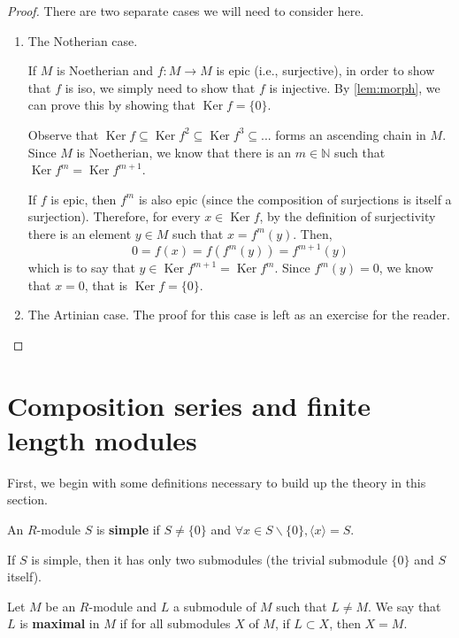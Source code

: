 \documentclass[12pt, a4paper, titlepage]{report}
\DeclareMathOperator{\Ker}{Ker}
\newcommand\dangle[1]{\langle {#1} \rangle}
\begin{document}
\begin{proof}
  There are two separate cases we will need to consider here.
  \begin{enumerate}[(1)]
  \item The Notherian case.

    If $M$ is Noetherian and $f : M \to M$ is epic (i.e., surjective), in order to show that $f$ is iso, we simply need to show that
    $f$ is injective. By \autoref{lem:morph}, we can prove this by showing that $\Ker f = \{0\}$.

    Observe that $\Ker f \subseteq \Ker f^2 \subseteq \Ker f^3 \subseteq ...$ forms an ascending chain in $M$. Since $M$ is
    Noetherian, we know that there is an $m \in \mathbb{N}$ such that $\Ker f^m = \Ker f^{m+1}$.

    If $f$ is epic, then $f^m$ is also epic (since the composition of surjections is itself a surjection). Therefore, for every
    $x \in \Ker f$, by the definition of surjectivity there is an element $y \in M$ such that $x = f^m(y)$.
    Then,
    \[
      0 = f(x) = f(f^m(y)) = f^{m+1}(y)
    \]
    which is to say that $y \in \Ker f^{m+1} = \Ker f^{m}$. Since $f^m(y) = 0$, we know that $x = 0$, that is $\Ker f = \{0\}$.

  \item The Artinian case. The proof for this case is left as an exercise for the reader.
  \end{enumerate}
\end{proof}

\section{Composition series and finite length modules}

First, we begin with some definitions necessary to build up the theory in this section.

\begin{defn}
  An $R$-module $S$ is \textbf{simple} if $S \neq \{0\}$ and $\forall x \in S\backslash\{0\}, \dangle{x} = S$.
\end{defn}

\begin{rem}
  If $S$ is simple, then it has only two submodules (the trivial submodule $\{0\}$ and $S$ itself).
\end{rem}

\begin{defn}
  Let $M$ be an $R$-module and $L$ a submodule of $M$ such that $L \neq M$. We say that $L$ is \textbf{maximal} in $M$ if for all submodules
  $X$ of $M$, if $L \subset X$, then $X = M$.
\end{defn}
\end{document}
